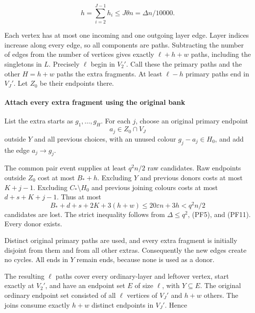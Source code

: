 \documentclass[11pt,a4paper]{article}
\begin{document}
\begin{equation}
h=\sum_{i=2}^{J-1}h_i\le J\theta n=\Delta n/10000.
\tag{PF11}\label{eq:PF11}
\end{equation}

Each vertex has at most one incoming and one outgoing layer edge. Layer indices increase along every edge, so all components are paths. Subtracting the number of edges from the number of vertices gives exactly \(\ell+h+w\) paths, including the singletons in \(L\). Precisely \(\ell\) begin in \(V_2'\). Call these the primary paths and the other \(H=h+w\) paths the extra fragments. At least \(\ell-h\) primary paths end in \(V_J'\). Let \(Z_0\) be their endpoints there.

\hypertarget{attach-every-extra-fragment-using-the-original-bank}{%
\paragraph{Attach every extra fragment using the original bank}\label{attach-every-extra-fragment-using-the-original-bank}}

List the extra starts as \(g_1,\ldots,g_H\). For each \(j\), choose an original primary endpoint \[
a_j\in Z_0\cap V_J
\] outside \(Y\) and all previous choices, with an unused colour \(g_j-a_j\in H_0\), and add the edge \(a_j\to g_j\).

The common pair event supplies at least \(q^2n/2\) raw candidates. Raw endpoints outside \(Z_0\) cost at most \(B_*+h\). Excluding \(Y\) and previous donors costs at most \(K+j-1\). Excluding \(C_*\setminus H_0\) and previous joining colours costs at most \(d+s+K+j-1\). Thus at most \begin{equation}
B_*+d+s+2K+3(h+w)
\le20\varepsilon n+3h<q^2n/2
\tag{PF12}\label{eq:PF12}
\end{equation} candidates are lost. The strict inequality follows from \(\Delta\le q^2\), (PF5), and (PF11). Every donor exists.

Distinct original primary paths are used, and every extra fragment is initially disjoint from them and from all other extras. Consequently the new edges create no cycles. All ends in \(Y\) remain ends, because none is used as a donor.

The resulting \(\ell\) paths cover every ordinary-layer and leftover vertex, start exactly at \(V_2'\), and have an endpoint set \(E\) of size \(\ell\), with \(Y\subseteq E\). The original ordinary endpoint set consisted of all \(\ell\) vertices of \(V_J'\) and \(h+w\) others. The joins consume exactly \(h+w\) distinct endpoints in \(V_J'\). Hence
\end{document}
